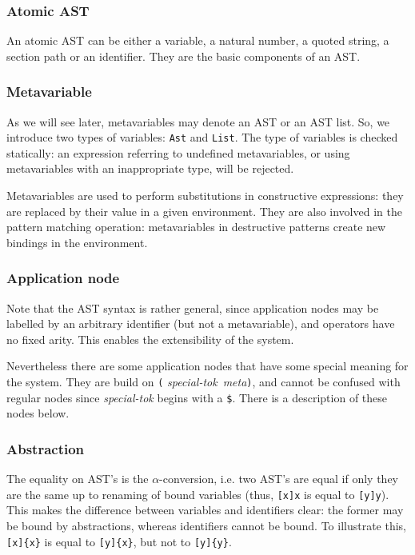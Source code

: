 \subsubsection{Atomic AST}

An atomic AST can be either a variable, a natural number, a quoted
string, a section path or an identifier. They are the basic components
of an AST.

\subsubsection{Metavariable}

As we will see later, metavariables may denote an AST or an AST list.
So, we introduce two types of variables: \verb+Ast+ and
\verb+List+. The type of variables is checked statically: an
expression referring to undefined metavariables, or using metavariables
with an inappropriate type, will be rejected.

Metavariables are used to perform substitutions in constructive
expressions: they are replaced by their value in a given
environment. They are also involved in the pattern matching operation:
metavariables in destructive patterns create new bindings in the
environment.

\subsubsection{Application node}

Note that the AST syntax is rather general, since application nodes
may be labelled by an arbitrary identifier (but not a metavariable),
and operators have no fixed arity. This enables the extensibility of
the system.

Nevertheless there are some application nodes that have some special
meaning for the system. They are build on \verb+(+{\sl
special-tok}~{\sl meta}\verb+)+, and cannot be confused with regular
nodes since {\sl special-tok} begins with a \verb+$+. There is a
description of these nodes below.

\subsubsection{Abstraction}

The equality on AST's is the $\alpha$-conversion, i.e. two AST's are
equal if only they are the same up to renaming of bound variables
(thus, \verb+[x]x+ is equal to \verb+[y]y+). This makes the difference
between variables and identifiers clear: the former may be bound by
abstractions, whereas identifiers cannot be bound. To illustrate this,
\verb+[x]{x}+ is equal to \verb+[y]{x}+, but not to \verb+[y]{y}+.

